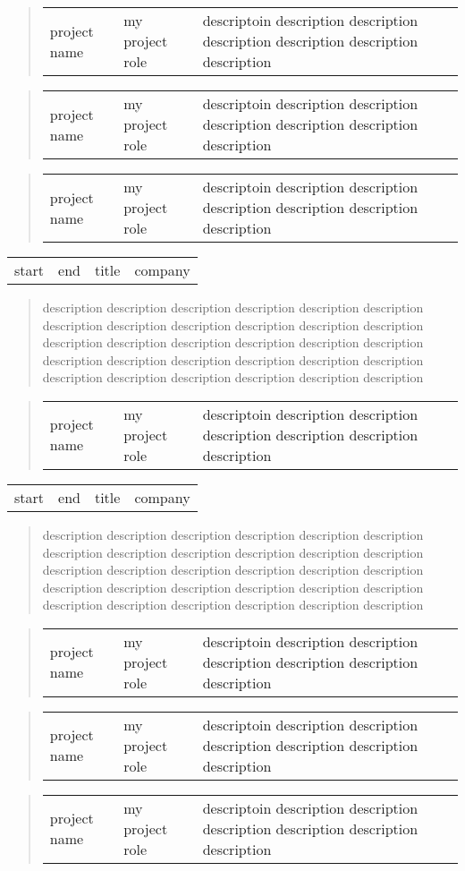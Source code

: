 \documentclass[11pt]{article}
\newcommand{\job}[5]{
  \begin{tabular}{llll}
    #1 & #2 & #3 & #4\\
  \end{tabular}
  \begin{quotation}
    \noindent#5
  \end{quotation} 
}
\newcommand{\icproject}[3]{
  \begin{quotation}
    \begin{tabular}{llp{3in}}
      #1 & #2 & #3\\ 
    \end{tabular}
  \end{quotation}
}
\begin{document}
\icproject{project name}{my project role}{descriptoin description description description
  description description description}

\icproject{project name}{my project role}{descriptoin description description description
  description description description}

\icproject{project name}{my project role}{descriptoin description description description
  description description description}

\job{start}{end}{title}{company}{description description description description
  description description description description description description
  description description description description description description
  description description description description description description
  description description description description description description
  description description}

\icproject{project name}{my project role}{descriptoin description description description
  description description description}

\job{start}{end}{title}{company}{description description description description
  description description description description description description
  description description description description description description
  description description description description description description
  description description description description description description
  description description}

\icproject{project name}{my project role}{descriptoin description description description
  description description description}

\icproject{project name}{my project role}{descriptoin description description description
  description description description}

\icproject{project name}{my project role}{descriptoin description description description
  description description description}
\end{document}
